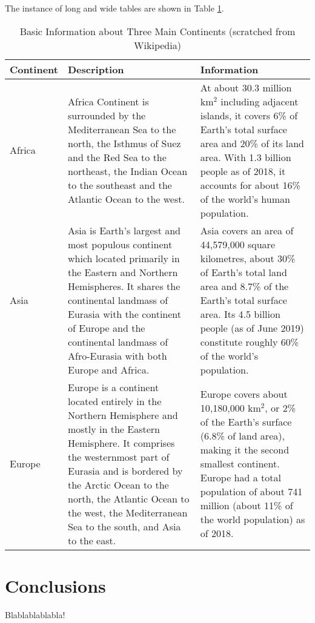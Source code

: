 \documentclass[12pt]{article}
\begin{document}
		The instance of long and wide tables are shown in Table \ref{tb:longtable}.
		
		\begin{longtable}{ p{4em} p{14em} p{14em} }
			\caption{Basic Information about Three Main Continents (scratched from Wikipedia)}
			\label{tb:longtable} \\
			\toprule
			Continent & Description & Information \\
			\midrule
			Africa & Africa Continent is surrounded by the Mediterranean Sea to the
			north, the Isthmus of Suez and the Red Sea to the northeast, the Indian
			Ocean to the southeast and the Atlantic Ocean to the west. &
			At about 30.3 million km$^2$ including adjacent islands, it covers 6\%
			of Earth's total surface area and 20\% of its land area. With 1.3
			billion people as of 2018, it accounts for about 16\% of the world's
			human population. \\
			\midrule
			Asia & Asia is Earth's largest and most populous continent which
			located primarily in the Eastern and Northern Hemispheres.
			It shares the continental landmass of Eurasia with the continent
			of Europe and the continental landmass of Afro-Eurasia with both
			Europe and Africa. &
			Asia covers an area of 44,579,000 square kilometres, about 30\%
			of Earth's total land area and 8.7\% of the Earth's total surface
			area. Its 4.5 billion people (as of June 2019) constitute roughly
			60\% of the world's population. \\
			\midrule
			Europe & Europe is a continent located entirely in the Northern
			Hemisphere and mostly in the Eastern Hemisphere. It comprises the
			westernmost part of Eurasia and is bordered by the Arctic Ocean to
			the north, the Atlantic Ocean to the west, the Mediterranean Sea to
			the south, and Asia to the east. &
			Europe covers about 10,180,000 km$^2$, or 2\% of the Earth's surface
			(6.8\% of land area), making it the second smallest
			continent. Europe had a total population of about 741 million (about
			11\% of the world population) as of 2018. \\
			\bottomrule
		\end{longtable}





\section{Conclusions}

	Blablablablabla!
\end{document}
